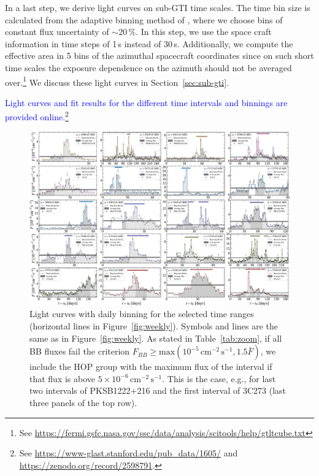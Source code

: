 \documentclass[twocolumn,linenumbers]{aastex62}
\newcommand{\response}[1]{\textcolor{blue}{#1}}
\begin{document}
In a last step, we derive light curves on sub-GTI time scales. 
The time bin size is calculated from the adaptive binning method of \citet{lott2012}, where we choose bins of constant flux uncertainty of $\sim20\,\%$. 
In this step, we use the space craft information in time steps of 1\,s instead of 30\,s. Additionally, we compute the effective area in 5 bins of the azimuthal spacecraft coordinates since on such short time scales the exposure dependence on the azimuth should not be averaged over.\footnote{See \url{https://fermi.gsfc.nasa.gov/ssc/data/analysis/scitools/help/gtltcube.txt}}
We discuss these light curves in Section~\ref{sec:sub-gti}.

\response{
Light curves and fit results for the different time intervals and binnings are provided online.\footnote{
See \url{https://www-glast.stanford.edu/pub_data/1605/} and \url{https://zenodo.org/record/2598791}.
}
}

\begin{figure}
    \centering
    \includegraphics[width = .99\linewidth]{lc_daily_tsmin9.pdf}
    \caption{\label{fig:daily} Light curves with daily binning for the selected time ranges (horizontal lines in Figure~\ref{fig:weekly}). Symbols and lines are the same as in Figure~\ref{fig:weekly}. 
    As stated in Table~\ref{tab:zoom}, if all BB fluxes fail the criterion $F_{BB} \geqslant \mathrm{max}(10^{-5}\,\mathrm{cm}^{-2}\,\mathrm{s}^{-1}, 1.5 \bar{F})$, we include the HOP group with the maximum flux of the interval if that flux is above $5\times 10^{-6}\,\mathrm{cm}^{-2}\,\mathrm{s}^{-1}$. This is the case, e.g., for last two intervals of PKSB1222+216 and the first interval of 3C273 (last three panels of the top row).}
\end{figure}
\end{document}
